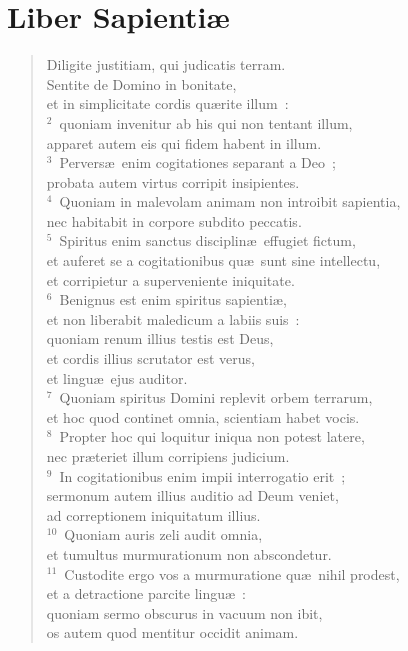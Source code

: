 \clearpage
{\centering \section*{Liber Sapientiæ}}\thispagestyle{empty}

\begin{flushleft}\begin{verse}\vspace{-11pt}Diligite justitiam, qui judicatis terram.\\ Sentite de Domino in bonitate,\\ et in simplicitate cordis qu\ae rite illum~:\\
${}^{2}$~quoniam invenitur ab his qui non tentant illum,\\ apparet autem eis qui fidem habent in illum.\\
${}^{3}$~Pervers\ae\ enim cogitationes separant a Deo~;\\ probata autem virtus corripit insipientes.\\
${}^{4}$~Quoniam in malevolam animam non introibit sapientia,\\ nec habitabit in corpore subdito peccatis.\\
${}^{5}$~Spiritus enim sanctus disciplin\ae\ effugiet fictum,\\ et auferet se a cogitationibus qu\ae\ sunt sine intellectu,\\ et corripietur a superveniente iniquitate.\\
${}^{6}$~Benignus est enim spiritus sapienti\ae ,\\ et non liberabit maledicum a labiis suis~:\\ quoniam renum illius testis est Deus,\\ et cordis illius scrutator est verus,\\ et lingu\ae\ ejus auditor.\\
${}^{7}$~Quoniam spiritus Domini replevit orbem terrarum,\\ et hoc quod continet omnia, scientiam habet vocis.\\
${}^{8}$~Propter hoc qui loquitur iniqua non potest latere,\\ nec pr\ae teriet illum corripiens judicium.\\
${}^{9}$~In cogitationibus enim impii interrogatio erit~;\\ sermonum autem illius auditio ad Deum veniet,\\ ad correptionem iniquitatum illius.\\
${}^{10}$~Quoniam auris zeli audit omnia,\\ et tumultus murmurationum non abscondetur.\\
${}^{11}$~Custodite ergo vos a murmuratione qu\ae\ nihil prodest,\\ et a detractione parcite lingu\ae~:\\ quoniam sermo obscurus in vacuum non ibit,\\ os autem quod mentitur occidit animam.\end{verse}\end{flushleft}


